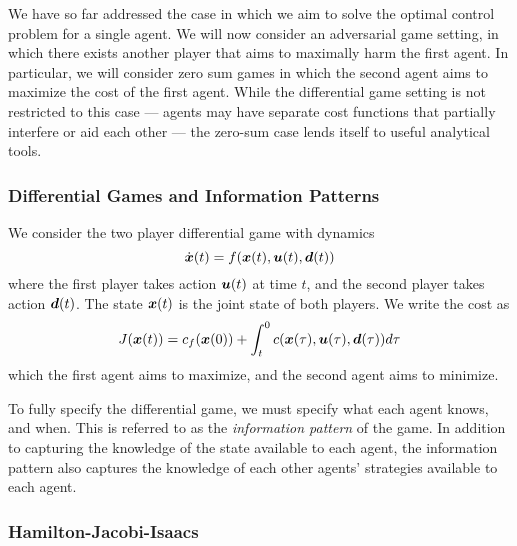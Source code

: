 We have so far addressed the case in which we aim to solve the optimal control problem for a single agent. We will now consider an adversarial game setting, in which there exists another player that aims to maximally harm the first agent. In particular, we will consider zero sum games in which the second agent aims to maximize the cost of the first agent. While the differential game setting is not restricted to this case --- agents may have separate cost functions that partially interfere or aid each other --- the zero-sum case lends itself to useful analytical tools. 

\subsubsection{Differential Games and Information Patterns}

We consider the two player differential game with dynamics
\begin{equation}
    \dot{\bm{x}}(t) = f(\bm{x}(t),\bm{u}(t),\bm{d}(t))
\end{equation}
where the first player takes action $\bm{u}(t)$ at time $t$, and the second player takes action $\bm{d}(t)$. The state $\bm{x}(t)$ is the joint state of both players. We write the cost as 
\begin{equation}
    J(\bm{x}(t)) = c_f(\bm{x}(0)) + \int_{t}^{0} c(\bm{x}(\tau),\bm{u}(\tau),\bm{d}(\tau)) d\tau
\end{equation}
which the first agent aims to maximize, and the second agent aims to minimize. 

To fully specify the differential game, we must specify what each agent knows, and when. This is referred to as the \textit{information pattern} of the game. In addition to capturing the knowledge of the state available to each agent, the information pattern also captures the knowledge of each other agents' strategies available to each agent. 


\subsubsection{Hamilton-Jacobi-Isaacs}

